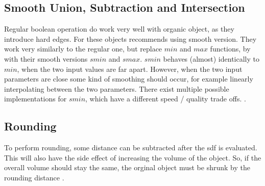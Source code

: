\subsection{Smooth Union, Subtraction and Intersection}
Regular boolean operation do work very well with organic object, as they introduce hard edges. For these objects  \textcite{quilez:2008:distfunctions} recommends using smooth version. They work very similarly to the regular one, but replace $min$ and $max$ functions, by with their smooth versions $smin$ and $smax$. $smin$ behaves (almost) identically to $min$, when the two input values are far apart. However, when the two input parameters are close some kind of smoothing should occur, for example linearly interpolating between the two parameters. There exist multiple possible implementations for $smin$, which have a different speed / quality trade offs. 
\cite{quilez:2008:distfunctions}\cite{quilez:2008:smoothmin}.

\subsection{Rounding}
To perform rounding, some distance can be subtracted after the \gls{sdf} is evaluated. This will also have the side effect of increasing the volume of the object. So, if the overall volume should stay the same, the orginal object must be shrunk by the rounding distance \cite{quilez:2008:distfunctions}.













